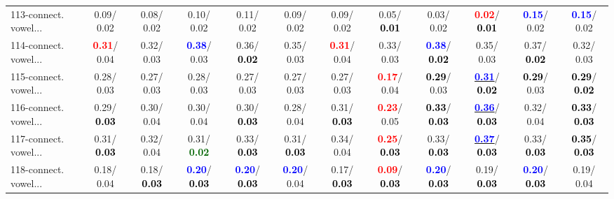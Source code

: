 \begin{table}[h]
\begin{center}
{\begin{tabular}{lc|c|c|c|c|c|c|c|c|c|c}
113-connect. vowel... &   0.09/  0.02 &   0.08/  0.02 &   0.10/  0.02 &   0.11/  0.02 &   0.09/  0.02 &   0.09/  0.02 &   0.05/\textcolor{black}{\textbf{  0.01}} &   0.03/  0.02 & \textcolor{red}{\textbf{  0.02}}/\textcolor{black}{\textbf{  0.01}} & \textcolor{blue}{\textbf{  0.15}}/  0.02 & \textcolor{blue}{\textbf{  0.15}}/  0.02 \\
114-connect. vowel... & \textcolor{red}{\textbf{  0.31}}/  0.04 &   0.32/  0.03 & \textcolor{blue}{\textbf{  0.38}}/  0.03 &   0.36/\textcolor{black}{\textbf{  0.02}} &   0.35/  0.03 & \textcolor{red}{\textbf{  0.31}}/  0.04 &   0.33/  0.03 & \textcolor{blue}{\textbf{  0.38}}/\textcolor{black}{\textbf{  0.02}} &   0.35/  0.03 &   0.37/\textcolor{black}{\textbf{  0.02}} &   0.32/  0.03 \\
115-connect. vowel... &   0.28/  0.03 &   0.27/  0.03 &   0.28/  0.03 &   0.27/  0.03 &   0.27/  0.03 &   0.27/  0.03 & \textcolor{red}{\textbf{  0.17}}/  0.04 & \textcolor{black}{\textbf{  0.29}}/  0.03 & \underline{\textcolor{blue}{\textbf{  0.31}}}/\textcolor{black}{\textbf{  0.02}} & \textcolor{black}{\textbf{  0.29}}/  0.03 & \textcolor{black}{\textbf{  0.29}}/\textcolor{black}{\textbf{  0.02}} \\
116-connect. vowel... &   0.29/\textcolor{black}{\textbf{  0.03}} &   0.30/  0.04 &   0.30/  0.04 &   0.30/\textcolor{black}{\textbf{  0.03}} &   0.28/  0.04 &   0.31/\textcolor{black}{\textbf{  0.03}} & \textcolor{red}{\textbf{  0.23}}/  0.05 & \textcolor{black}{\textbf{  0.33}}/\textcolor{black}{\textbf{  0.03}} & \underline{\textcolor{blue}{\textbf{  0.36}}}/\textcolor{black}{\textbf{  0.03}} &   0.32/  0.04 & \textcolor{black}{\textbf{  0.33}}/\textcolor{black}{\textbf{  0.03}} \\
117-connect. vowel... &   0.31/\textcolor{black}{\textbf{  0.03}} &   0.32/  0.04 &   0.31/\textcolor{darkgreen}{\textbf{  0.02}} &   0.33/\textcolor{black}{\textbf{  0.03}} &   0.31/\textcolor{black}{\textbf{  0.03}} &   0.34/  0.04 & \textcolor{red}{\textbf{  0.25}}/\textcolor{black}{\textbf{  0.03}} &   0.33/\textcolor{black}{\textbf{  0.03}} & \underline{\textcolor{blue}{\textbf{  0.37}}}/\textcolor{black}{\textbf{  0.03}} &   0.33/\textcolor{black}{\textbf{  0.03}} & \textcolor{black}{\textbf{  0.35}}/\textcolor{black}{\textbf{  0.03}} \\ \hline
118-connect. vowel... &   0.18/  0.04 &   0.18/\textcolor{black}{\textbf{  0.03}} & \textcolor{blue}{\textbf{  0.20}}/\textcolor{black}{\textbf{  0.03}} & \textcolor{blue}{\textbf{  0.20}}/\textcolor{black}{\textbf{  0.03}} & \textcolor{blue}{\textbf{  0.20}}/  0.04 &   0.17/\textcolor{black}{\textbf{  0.03}} & \textcolor{red}{\textbf{  0.09}}/\textcolor{black}{\textbf{  0.03}} & \textcolor{blue}{\textbf{  0.20}}/\textcolor{black}{\textbf{  0.03}} &   0.19/\textcolor{black}{\textbf{  0.03}} & \textcolor{blue}{\textbf{  0.20}}/\textcolor{black}{\textbf{  0.03}} &   0.19/  0.04 \\

\end{tabular}}
\end{center}
\end{table}
